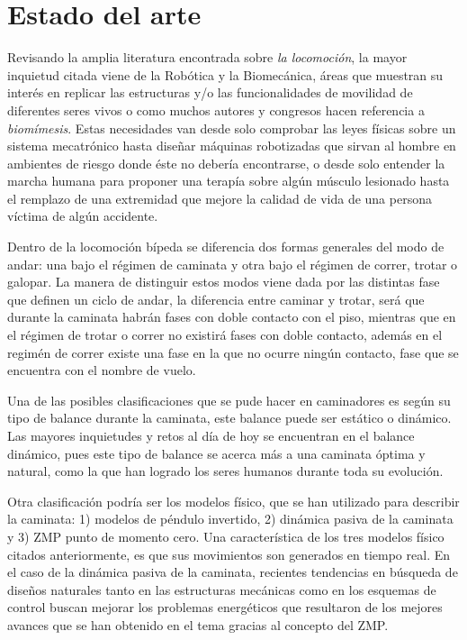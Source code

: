 \documentclass[12pt,twoside,onecolumn,letterpaper]{article}
\begin{document}
\section{Estado del arte}
\label{sec:arte}
Revisando la amplia literatura encontrada sobre \emph{la locomoci\'on}, la mayor inquietud citada viene de la Rob\'otica\cite{Xiang2010,Mattar2013} y la Biomec\'anica\cite{Xiang2010,Mattar2013}, \'areas que muestran su interés en replicar las estructuras y/o las funcionalidades de movilidad de diferentes seres vivos\cite{Xu2013,Chiang2013} o como muchos autores\cite{Xu2013} y congresos\cite{RB2009} hacen referencia a \emph{biom\'imesis}. Estas necesidades van desde solo comprobar las leyes f\'isicas sobre un sistema mecatr\'onico\cite{Barker2010,Lens2011} hasta dise\~nar m\'aquinas robotizadas que sirvan al hombre en ambientes de riesgo donde \'este no deber\'ia encontrarse\cite{Seifried2014,Wu2013a}, o desde solo entender la marcha humana para proponer una terap\'ia sobre alg\'un m\'usculo lesionado\cite{Kang2013} hasta el remplazo de una extremidad que mejore la calidad de vida de una persona v\'ictima de alg\'un accidente\cite{Roa2006,Wu2013a}.\par
Dentro de la locomoci\'on b\'ipeda se diferencia dos formas generales del modo de andar: una bajo el r\'egimen de caminata y otra bajo el r\'egimen de correr, trotar o galopar\cite{Geyer2006}. La manera de distinguir estos modos viene dada por las distintas fase que definen un ciclo de andar, la diferencia entre caminar y trotar, ser\'a que durante la caminata habr\'an fases con doble contacto con el piso, mientras que en el r\'egimen de trotar o correr no existirá fases con doble contacto\cite{Geyer2006}, adem\'as en el regim\'en de correr existe una fase en la que no ocurre ningún contacto, fase que se encuentra con el nombre de vuelo.\par
Una de las posibles clasificaciones que se pude hacer en caminadores es seg\'un su tipo de balance durante la caminata, este balance puede ser est\'atico o din\'amico\cite{Braunl2008}. Las mayores inquietudes y retos al d\'ia de hoy se encuentran en el balance din\'amico, pues este tipo de balance se acerca m\'as a una caminata \'optima y natural, como la que han logrado los seres humanos durante toda su evoluci\'on.\par
Otra clasificaci\'on podr\'ia ser los modelos físico, que se han utilizado para describir la caminata\cite{Xiang2010}: 1) modelos de p\'endulo invertido, 2) din\'amica pasiva de la caminata y 3) ZMP punto de momento cero. Una caracter\'istica de los tres modelos f\'isico citados anteriormente, es que sus movimientos son generados en tiempo real\cite{Xiang2010}. En el caso de la din\'amica pasiva de la caminata, recientes tendencias en b\'usqueda de dise\~nos naturales tanto en las estructuras mec\'anicas como en los esquemas de control buscan mejorar los problemas energ\'eticos que resultaron de los mejores avances que se han obtenido en el tema gracias al concepto del ZMP\cite{Xiang2010}.\par
\end{document}
